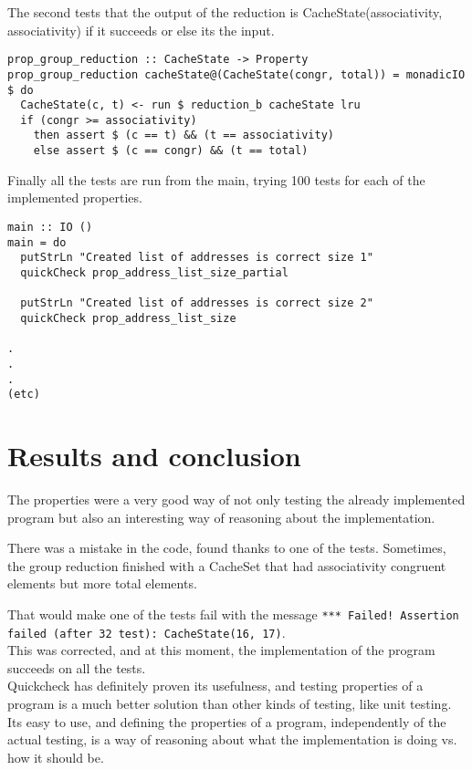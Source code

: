 \documentclass[11pt]{article}
\begin{document}
The second tests that the output of the reduction is CacheState(associativity, associativity) if it succeeds or else its the input.
\begin{verbatim}
prop_group_reduction :: CacheState -> Property
prop_group_reduction cacheState@(CacheState(congr, total)) = monadicIO $ do
  CacheState(c, t) <- run $ reduction_b cacheState lru
  if (congr >= associativity)
    then assert $ (c == t) && (t == associativity)
    else assert $ (c == congr) && (t == total)
\end{verbatim}

Finally all the tests are run from the main, trying 100 tests for each of the implemented properties.
\begin{verbatim}
main :: IO ()
main = do
  putStrLn "Created list of addresses is correct size 1"
  quickCheck prop_address_list_size_partial
  
  putStrLn "Created list of addresses is correct size 2"
  quickCheck prop_address_list_size

.
.
.
(etc)
\end{verbatim}

\clearpage
\section{Results and conclusion}
The properties were a very good way of not only testing the already implemented program but also an interesting way of reasoning about the implementation.

There was a mistake in the code, found thanks to one of the tests.
Sometimes, the group reduction finished with a CacheSet that had associativity congruent elements but more total elements.

That would make one of the tests fail with the message \texttt{*** Failed! Assertion failed (after 32 test):  CacheState(16, 17)}.\\

This was corrected, and at this moment, the implementation of the program succeeds on all the tests.\\

Quickcheck has definitely proven its usefulness, and testing properties of a program is a much better solution than other kinds of testing, like unit testing. Its easy to use, and defining the properties of a program, independently of the actual testing, is a way of reasoning about what the implementation is doing vs. how it should be.

\clearpage



\clearpage
\end{document}
